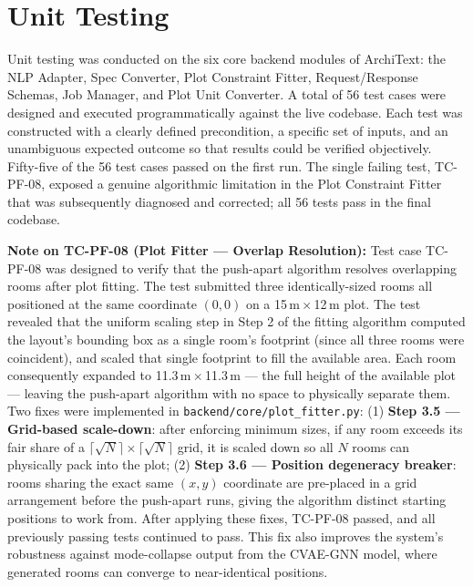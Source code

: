 

\section{Unit Testing}

Unit testing was conducted on the six core backend modules of ArchiText: the NLP Adapter, Spec Converter, Plot Constraint Fitter, Request/Response Schemas, Job Manager, and Plot Unit Converter. A total of 56 test cases were designed and executed programmatically against the live codebase. Each test was constructed with a clearly defined precondition, a specific set of inputs, and an unambiguous expected outcome so that results could be verified objectively. Fifty-five of the 56 test cases passed on the first run. The single failing test, TC-PF-08, exposed a genuine algorithmic limitation in the Plot Constraint Fitter that was subsequently diagnosed and corrected; all 56 tests pass in the final codebase.

\medskip
\noindent\textbf{Note on TC-PF-08 (Plot Fitter — Overlap Resolution):}
Test case TC-PF-08 was designed to verify that the push-apart algorithm resolves overlapping rooms after plot fitting. The test submitted three identically-sized rooms all positioned at the same coordinate \((0, 0)\) on a 15\,m\,$\times$\,12\,m plot. The test revealed that the uniform scaling step in Step 2 of the fitting algorithm computed the layout's bounding box as a single room's footprint (since all three rooms were coincident), and scaled that single footprint to fill the available area. Each room consequently expanded to 11.3\,m\,$\times$\,11.3\,m — the full height of the available plot — leaving the push-apart algorithm with no space to physically separate them. Two fixes were implemented in \texttt{backend/core/plot\_fitter.py}: (1) \textbf{Step 3.5 — Grid-based scale-down}: after enforcing minimum sizes, if any room exceeds its fair share of a $\lceil\sqrt{N}\rceil \times \lceil\sqrt{N}\rceil$ grid, it is scaled down so all $N$ rooms can physically pack into the plot; (2) \textbf{Step 3.6 — Position degeneracy breaker}: rooms sharing the exact same $(x, y)$ coordinate are pre-placed in a grid arrangement before the push-apart runs, giving the algorithm distinct starting positions to work from. After applying these fixes, TC-PF-08 passed, and all previously passing tests continued to pass. This fix also improves the system's robustness against mode-collapse output from the CVAE-GNN model, where generated rooms can converge to near-identical positions.

